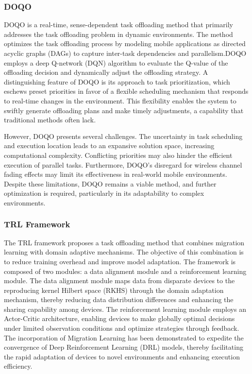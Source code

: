 \documentclass[journal]{IEEEtran}
\begin{document}
\subsubsection{DOQO}

DOQO is a real-time, sense-dependent task offloading method that primarily addresses the task offloading problem in dynamic environments. The method optimizes the task offloading process by modeling mobile applications as directed acyclic graphs (DAGs) to capture inter-task dependencies and parallelism.DOQO employs a deep Q-network (DQN) algorithm to evaluate the Q-value of the offloading decision and dynamically adjust the offloading strategy. A distinguishing feature of DOQO is its approach to task prioritization, which eschews preset priorities in favor of a flexible scheduling mechanism that responds to real-time changes in the environment. This flexibility enables the system to swiftly generate offloading plans and make timely adjustments, a capability that traditional methods often lack. 

However, DOQO presents several challenges. The uncertainty in task scheduling and execution location leads to an expansive solution space, increasing computational complexity. Conflicting priorities may also hinder the efficient execution of parallel tasks. Furthermore, DOQO's disregard for wireless channel fading effects may limit its effectiveness in real-world mobile environments. Despite these limitations, DOQO remains a viable method, and further optimization is required, particularly in its adaptability to complex environments.~\cite{zhou01}

\subsubsection{TRL Framework}

The TRL framework proposes a task offloading method that combines migration learning with domain adaptive mechanisms. The objective of this combination is to reduce training overhead and improve model adaptation. The framework is composed of two modules: a data alignment module and a reinforcement learning module. The data alignment module maps data from disparate devices to the reproducing kernel Hilbert space (RKHS) through the domain adaptation mechanism, thereby reducing data distribution differences and enhancing the sharing capability among devices. The reinforcement learning module employs an Actor-Critic architecture, enabling devices to make globally optimal decisions under limited observation conditions and optimize strategies through feedback. The incorporation of Migration Learning has been demonstrated to expedite the convergence of Deep Reinforcement Learning (DRL) models, thereby facilitating the rapid adaptation of devices to novel environments and enhancing execution efficiency. 
\end{document}
